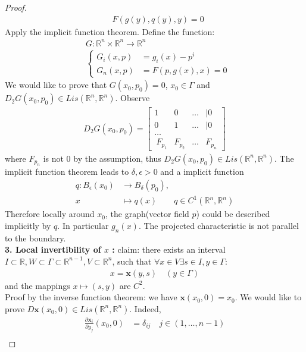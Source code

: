 \documentclass[a4paper,11pt,oneside,fleqn]{book}
\theoremstyle{definition}
\theoremstyle{remark}
\begin{document}
\begin{proof}
\begin{align*}
	&F(g(y), q(y), y) = 0
\end{align*} 
Apply the implicit function theorem. Define the function:
\begin{align*}
	&G: \mathbb{R}^n \times \mathbb{R}^n \rightarrow \mathbb{R}^n \\
	&\left\{
	\begin{aligned}
		G_i(x, p) &= g_i(x) - p^i\\
		G_n(x, p) &= F(p, g(x), x) = 0 
	\end{aligned}
	\right.
\end{align*} 
We would like to prove that $G(x_0, p_0) = 0$, $x_0 \in \Gamma$ and $D_2 G(x_0, p_0) \in Lis(\mathbb{R}^n, \mathbb{R}^n)$. Observe
\begin{align*}
	D_2G(x_0, p_0 ) =
	\begin{bmatrix}
		1 & 0 & \dots &|0\\
		0 & 1 & \dots &|0\\
		\dots\\\
		F_{p_1} & F_{p_2} & \dots & F_{p_n} 
	\end{bmatrix}
\end{align*}
where $F_{p_n}$ is not $0$ by the assumption, thus $D_2G(x_0, p_0) \in Lis(\mathbb{R}^n, \mathbb{R}^n)$.   The implicit function theorem leads to $\delta, \epsilon > 0$ and a implicit function 
\begin{align*}
	q: B_{\epsilon}(x_0) &\rightarrow B_\delta(p_0),\quad \\
	x &\mapsto q(x)  \qquad q \in C^1(\mathbb{R}^n, \mathbb{R}^n)
\end{align*}
Therefore locally around $x_0$, the graph(vector field $p$) could be described implicitly by $q$. In particular $g_n(x)$. The projected characteristic is not parallel to the boundary. \\
\textbf{3. Local invertibility of $x$ :} claim: there exists an interval $I \subset \mathbb{R}, W \subset \Gamma \subset  \mathbb{R}^{n-1}, V \subset \mathbb{R}^n$, such that $\forall x \in V \exists s \in I, y \in \Gamma:$
\begin{align*}
	x = \textbf{x}(y, s) \quad (y \in \Gamma) 
\end{align*}
and the mappings $x \mapsto (s, y)$ are $C^2$. \\
Proof by the inverse function theorem: we have $\textbf{x}(x_0,0) = x_0$. We would like to prove $D \textbf{x}(x_0, 0) \in Lis(\mathbb{R}^n, \mathbb{R}^n)$. Indeed,
\begin{align*}
	\frac{\partial \textbf{x}_i }{\partial y_j}(x_0, 0) &= \delta_{ij} \quad j\in (1, \dots, n-1) \\

\end{align*}
\end{proof}
\end{document}
